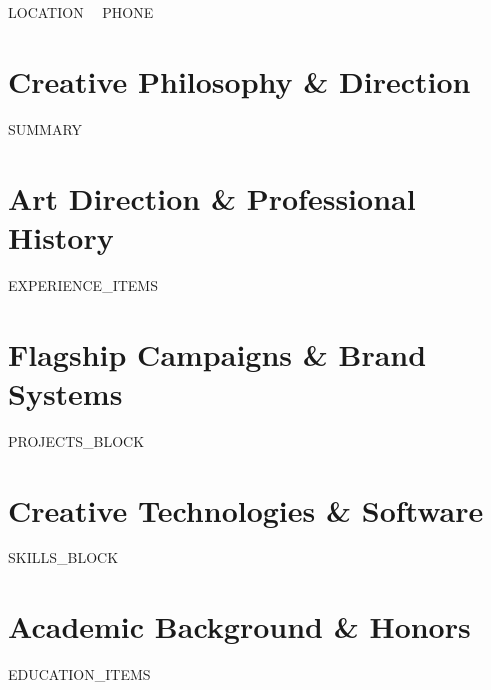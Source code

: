 \documentclass[10pt,letterpaper]{article}
\begin{document}
\noindent
\colorbox{bannerbg}{%
  \begin{minipage}{\dimexpr\textwidth-2\fboxsep\relax}
    \vspace{6pt}
    {\Huge \textbf{}} \\[4pt]
    {\normalsize \textbf{}} \\[6pt]
    \small\color{gray!30}
    {{LOCATION}} \ \textbullet \ 
    {{PHONE}} \ \textbullet \ 
    \href{mailto:{{EMAIL}}}{} \ \textbullet \ 
    \href{https://{{WEBSITE}}}{}
    \vspace{6pt}
  \end{minipage}%
}

\vspace{10pt}

\section{Creative Philosophy \& Direction}
\small
{{SUMMARY}}

\section{Art Direction \& Professional History}
\small
{{EXPERIENCE_ITEMS}}

\section{Flagship Campaigns \& Brand Systems}
\small
{{PROJECTS_BLOCK}}

\section{Creative Technologies \& Software}
\small
{{SKILLS_BLOCK}}

\section{Academic Background \& Honors}
\small
{{EDUCATION_ITEMS}}
\end{document}
